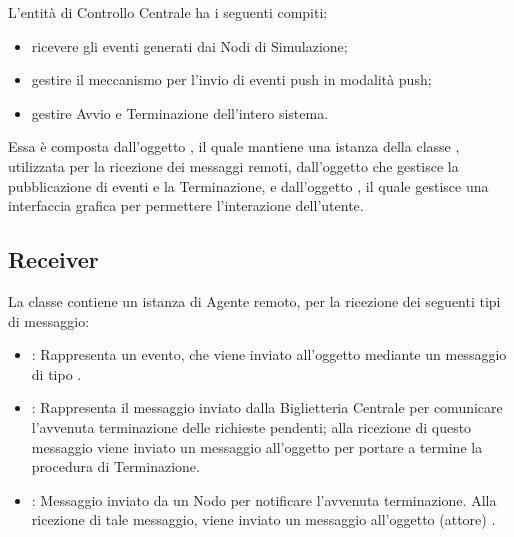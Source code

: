 	L'entità di Controllo Centrale ha i seguenti compiti:
	
	\begin{itemize}
		\item ricevere gli eventi generati dai Nodi di Simulazione;
		\item gestire il meccanismo  per l'invio di eventi push in modalità push;
		\item gestire Avvio e Terminazione dell'intero sistema.
	\end{itemize}
	
	Essa è composta dall'oggetto , il quale mantiene una istanza della classe , utilizzata per la ricezione dei messaggi remoti, dall'oggetto   che gestisce la pubblicazione di eventi e la Terminazione, e dall'oggetto  , il quale gestisce una interfaccia grafica per permettere l'interazione dell'utente.
	
	\subsection{Receiver}
	La classe  contiene un istanza di Agente remoto, per la ricezione dei seguenti tipi di messaggio:
	\begin{itemize}
		\item {}: Rappresenta un evento, che viene inviato all'oggetto  mediante un messaggio di tipo .
		\item {}: Rappresenta il messaggio inviato dalla Biglietteria Centrale per comunicare l'avvenuta terminazione delle richieste pendenti; alla ricezione di questo messaggio viene inviato un messaggio  all'oggetto  per portare a termine la procedura di Terminazione.
		\item {}: Messaggio inviato da un Nodo per notificare l'avvenuta terminazione. Alla ricezione di tale messaggio, viene inviato un messaggio  all'oggetto (attore) .
	\end{itemize}
	

